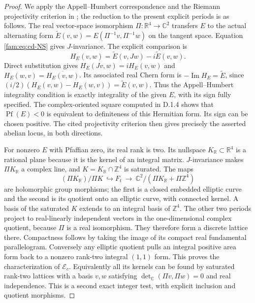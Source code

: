 \begin{proof}
We apply the Appell--Humbert correspondence and the Riemann projectivity
criterion in \cite[Theorems 4.1 and 4.4]{Schnell19}; the reduction to the
present explicit periods is as follows. The real vector-space isomorphism
$\Pi:\mathbb R^4\to\mathbb C^2$ transfers $E$ to the actual alternating
form $\widetilde E(v,w)=E(\Pi^{-1}v,\Pi^{-1}w)$ on the tangent space.
Equation \eqref{fam:eq:cd-NS} gives $J$-invariance. The explicit comparison is
\[
 H_E(v,w)=\widetilde E(v,Jw)-i\widetilde E(v,w).
\]
Direct substitution gives $H_E(Jv,w)=iH_E(v,w)$ and
$H_E(w,v)=\overline{H_E(v,w)}$. Its associated real Chern form is
$-\operatorname{Im}H_E=\widetilde E$, since
$(i/2)(H_E(v,w)-H_E(w,v))=\widetilde E(v,w)$.
Thus the Appell--Humbert integrality condition is exactly integrality
of the given $E$, with its sign fully specified. The complex-oriented square computed in D.1.4 shows that
$\operatorname{Pf}(E)<0$ is equivalent to definiteness of this Hermitian
form. Its sign can be chosen positive. The cited projectivity criterion
then gives precisely the asserted abelian locus, in both directions.

For nonzero $E$ with Pfaffian zero, its real rank is two. Its nullspace
$K_{\mathbb R}\subset\mathbb R^4$ is a rational plane because it is the
kernel of an integral matrix. $J$-invariance makes $\Pi K_{\mathbb R}$ a
complex line, and $K=K_{\mathbb R}\cap\mathbb Z^4$ is saturated. The maps
\[
 (\Pi K_{\mathbb R})/\Pi K\ \hookrightarrow F_t
 \ \longrightarrow\
 \mathbb C^2/(\Pi K_{\mathbb R}+\Pi\mathbb Z^4)
\]
are holomorphic group morphisms; the first is a closed embedded elliptic
curve and the second is its quotient onto an elliptic curve, with
connected kernel. A basis of the saturated $K$ extends to an integral basis of $\mathbb Z^4$.
The other two periods project to real-linearly independent vectors in the
one-dimensional complex quotient, because $\Pi$ is a real isomorphism.
They therefore form a discrete lattice there. Compactness follows by
taking the image of its compact real fundamental parallelogram. Conversely any elliptic quotient
pulls an integral positive area form back to a nonzero rank-two integral
$(1,1)$ form. This proves the characterization of $\mathcal E_c$.
Equivalently all its kernels can be found by saturated rank-two lattices
with a basis $v,w$ satisfying
$\det_{\mathbb C}(\Pi v,\Pi w)=0$ and real independence. This is a second
exact integer test, with explicit inclusion and quotient morphisms.


\end{proof}
